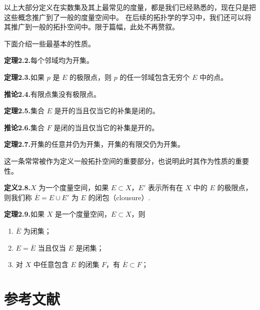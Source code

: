 \documentclass{article}
\begin{document}
以上大部分定义在实数集及其上最常见的度量，都是我们已经熟悉的，现在只是把这些概念推广到了一般的度量空间中。
在后续的拓扑学的学习中，我们还可以将其推广到一般的拓扑空间中。限于篇幅，此处不再赘叙。

下面介绍一些最基本的性质。

\textbf{定理2.2.}每个邻域均为开集。

\textbf{定理2.3.}如果 $p$ 是 $E$ 的极限点，则 $p$ 的任一邻域包含无穷个 $E$ 中的点。

\textbf{推论2.4.}有限点集没有极限点。

\textbf{定理2.5.}集合 $E$ 是开的当且仅当它的补集是闭的。

\textbf{推论2.6.}集合 $F$ 是闭的当且仅当它的补集是开的。

\textbf{定理2.7.}开集的任意并仍为开集，开集的有限交仍为开集。

这一条常常被作为定义一般拓扑空间的重要部分，也说明此时其作为性质的重要性。

\textbf{定义2.8.}$X$ 为一个度量空间，如果 $E\subset X$，$E'$ 表示所有在 $X$ 中的 $E$ 的极限点，
则我们称 $\overline{E} = E\cup E'$ 为 $E$ 的闭包（clousure）.

\textbf{定理2.9.}如果 $X$ 是一个度量空间，$E\subset X$，则
\begin{enumerate}[label={\textbullet}]
    \item $\overline{E}$ 为闭集；
    \item $E = \overline{E}$ 当且仅当 $E$ 是闭集；
    \item 对 $X$ 中任意包含 $E$ 的闭集 $F$，有 $\overline{E} \subset F$；
\end{enumerate}

\section*{参考文献} %
\end{document}
